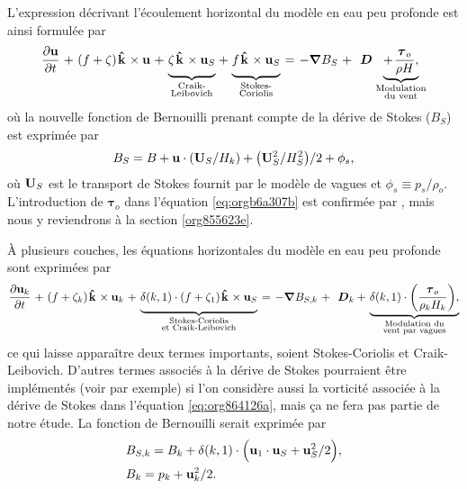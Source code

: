 \documentclass[10pt]{report}
\numberwithin{equation}{section}
\newcommand{\kvf}{\vb{\hat{k}}}
\newcommand{\uu}{\vb{u}}
\newcommand{\tall}{\vphantom{A^{x^x}_p}}
\newcommand{\grande}{\vphantom{\frac{1}{xx}}}
\newcommand{\pt}{\hspace{1pt}} %
\begin{document}
L'expression décrivant l'écoulement horizontal du modèle en eau peu profonde est ainsi formulée par
\begin{equation}
\label{eq:orgb6a307b}
   \pdv{\uu}{t}
   \pt + \pt \qty(f+\zeta)\pt \kvf\pt \times \uu
   \pt + \pt \underbrace{\grande\zeta\pt \kvf\pt \times \uu_S}_{\substack{\text{Craik-}\\ \text{Leibovich}}}
   \pt + \pt \underbrace{\grande f\pt \kvf\pt \times \uu_S  }_{\substack{\text{Stokes-}\\ \text{Coriolis}}}
   \pt = \pt -\gradient{B_S}
   \pt + \pt \ \boldsymbol{D}
    \pt \underbrace{+\pt\frac{\boldsymbol{\tau}_o}{\rho H},}_{\substack{\text{Modulation}\\ \text{du vent}}}
\end{equation}
où la nouvelle fonction de Bernouilli prenant compte de la dérive de Stokes (\(B_S\)) est exprimée par
\begin{align}
   B_S = B + \uu\cdot\qty(\vb{U}_S/H_k) + \qty(\vb{U}_S^2/H_S^2)/2 + \phi_s,
\end{align}
où \(\vb{U}_S\) est le transport de Stokes fournit par le modèle de vagues et \(\phi_s\equiv p_s/\rho_o\).
L'introduction de \(\boldsymbol{\tau}_o\) dans l'équation \ref{eq:orgb6a307b} est confirmée par \Textcite{breivik_al_2015}, mais nous y reviendrons à la section \ref{org855623e}.
\bigskip

À plusieurs couches, les équations horizontales du modèle en eau peu profonde sont exprimées par
\begin{equation}
\label{eq:org864126a}
   \pdv{\uu_k}{t}
   \pt + \pt \qty(f+\zeta_k)\pt \kvf\pt \times \uu_k
   \pt + \pt \underbrace{\delta(k,1)\cdot\grande\qty(f + \zeta_1)\pt \kvf\pt \times \uu_S}_{\substack{\text{Stokes-Coriolis}\\ \text{et Craik-Leibovich}}}
   \pt = \pt -\gradient{B_{S,k}}
   \pt + \pt \ \boldsymbol{D}_k
   +\pt \underbrace{\delta(k,1)\cdot\qty(\frac{\boldsymbol{\tau}_o}{\rho_k H_k}),}_{\substack{\text{Modulation du}\\ \text{vent par vagues}}}
\end{equation}
ce qui laisse apparaître deux termes importants, soient Stokes-Coriolis et Craik-Leibovich.
D'autres termes associés à la dérive de Stokes pourraient être implémentés (voir \Textcite{wu_breivik_2019} par exemple) si l'on considère aussi la vorticité associée à la dérive de Stokes dans l'équation \ref{eq:org864126a}, mais ça ne fera pas partie de notre étude.
La fonction de Bernouilli serait exprimée par
\begin{align}
   & B_{S,k} = B_k + \delta(k,1)\cdot\qty(\tall\uu_1\cdot\vb{u}_S + \vb{u}_S^2/2), \\
   & B_k = p_k + \vb{u}_k^2/2.
\end{align}
\end{document}

